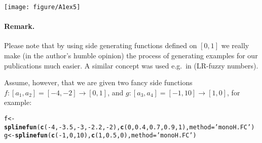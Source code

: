 \documentclass[11pt]{article}\usepackage[]{graphicx}\usepackage[]{color}
\makeatletter
\newcommand{\hlnum}[1]{\textcolor[rgb]{0.686,0.059,0.569}{#1}}%
\newcommand{\hlstr}[1]{\textcolor[rgb]{0.192,0.494,0.8}{#1}}%
\newcommand{\hlopt}[1]{\textcolor[rgb]{0,0,0}{#1}}%
\newcommand{\hlstd}[1]{\textcolor[rgb]{0.345,0.345,0.345}{#1}}%
\newcommand{\hlkwb}[1]{\textcolor[rgb]{0.69,0.353,0.396}{#1}}%
\newcommand{\hlkwc}[1]{\textcolor[rgb]{0.333,0.667,0.333}{#1}}%
\newcommand{\hlkwd}[1]{\textcolor[rgb]{0.737,0.353,0.396}{\textbf{#1}}}%
\newenvironment{kframe}{%
 \def\at@end@of@kframe{}%
 \ifinner\ifhmode%
  \def\at@end@of@kframe{\end{minipage}}%
  \begin{minipage}{\columnwidth}%
 \fi\fi%
 \def\FrameCommand##1{\hskip\@totalleftmargin \hskip-\fboxsep
 \colorbox{shadecolor}{##1}\hskip-\fboxsep
     \hskip-\linewidth \hskip-\@totalleftmargin \hskip\columnwidth}%
 \MakeFramed {\advance\hsize-\width
   \@totalleftmargin\z@ \linewidth\hsize
   \@setminipage}}%
 {\par\unskip\endMakeFramed%
 \at@end@of@kframe}
\newenvironment{knitrout}{}{} %
\makeatother
\begin{document}
\begin{center}
\begin{knitrout}\small
{}\color{fgcolor}

{\centering \texttt{[image: figure/A1ex5]} 

}



\end{knitrout}
\end{center}







\paragraph{Remark.}
Please note that by using side generating functions defined on $[0,1]$
we really make (in the author's humble opinion) the process of generating
examples for our publications much easier.
A similar concept was used e.g.~in \cite{StefaniniSorini2009:eusflat}
(LR-fuzzy numbers).

Assume, however, that we are given two fancy side
functions $f: [a_1,a_2]=[-4,-2]\to[0,1]$,
and $g: [a_3,a_4]=[-1,10]\to[1,0]$,
for example:

\begin{knitrout}\small
{}\color{fgcolor}\begin{kframe}
\begin{alltt}
\hlstd{f} \hlkwb{<-} \hlkwd{splinefun}\hlstd{(}\hlkwd{c}\hlstd{(}\hlopt{-}\hlnum{4}\hlstd{,}\hlopt{-}\hlnum{3.5}\hlstd{,}\hlopt{-}\hlnum{3}\hlstd{,}\hlopt{-}\hlnum{2.2}\hlstd{,}\hlopt{-}\hlnum{2}\hlstd{),} \hlkwd{c}\hlstd{(}\hlnum{0}\hlstd{,}\hlnum{0.4}\hlstd{,}\hlnum{0.7}\hlstd{,}\hlnum{0.9}\hlstd{,}\hlnum{1}\hlstd{),} \hlkwc{method}\hlstd{=}\hlstr{'monoH.FC'}\hlstd{)}
\hlstd{g} \hlkwb{<-} \hlkwd{splinefun}\hlstd{(}\hlkwd{c}\hlstd{(}\hlopt{-}\hlnum{1}\hlstd{,}\hlnum{0}\hlstd{,}\hlnum{10}\hlstd{),} \hlkwd{c}\hlstd{(}\hlnum{1}\hlstd{,}\hlnum{0.5}\hlstd{,}\hlnum{0}\hlstd{),} \hlkwc{method}\hlstd{=}\hlstr{'monoH.FC'}\hlstd{)}
\end{alltt}
\end{kframe}
\end{knitrout}
\end{document}
